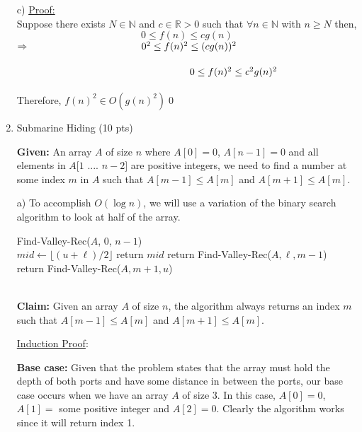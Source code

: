 \documentclass[11pt]{article}
\begin{document}
\begin{enumerate}
c) \underline{Proof:}\\
\-\hspace{1.5cm}Suppose there exists ${N \in \mathbb{N}}$ and ${c \in \mathbb{R} > 0}$ such that ${\forall n \in \mathbb{N}}$ with ${n \geq N}$ then, $$0 \leq f(n) \leq cg(n)$$ 
\-\hspace{1.5cm}${\Rightarrow \-\hspace{3.95cm} 0^2 \leq f(n)^2 \leq (cg(n))^2}$\\
\- \\
${\-\hspace{6.1cm} 0 \leq f(n)^2 \leq c^2g(n)^2}$\\
\- \\
\-\hspace{1.5cm} Therefore, ${f(n)^2 \in O(g(n)^2)}$\-\hspace{9cm}\qed

\item Submarine Hiding (10 pts)

{\bf Given:} An array $A$ of size $n$ where $A[0] = 0$, $A[n - 1] = 0$ and all elements in $A[1$ .... $n-2]$ are positive integers, we need to find a number at some index $m$ in $A$ such that $A[m - 1] \leq A[m]$ and $A[m + 1] \leq A[m]$.

a) To accomplish $O(\log n)$, we will use a variation of the binary search algorithm to look at half of the array. 
\- \\

\begin{algorithmic}[1]
	\State Find-Valley-Rec($A$, 0, $n-1$)
\EndFunction
\\
 \State ${mid \gets \lfloor (u + \ell)/2  \rfloor}$
	\State return $mid$
	\State return Find-Valley-Rec($A, \ell, m - 1$)
\Else 
	\State return Find-Valley-Rec($A, m + 1, u$)
\EndIf 
\EndFunction
\end{algorithmic}

\- \\
{\bf Claim:} Given an array $A$ of size $n$, the algorithm always returns an index $m$ such that $A[m - 1] \leq A[m]$ and $A[m + 1] \leq A[m]$.

\underline{Induction Proof}:

{\bf Base case:} Given that the problem states that the array must hold the depth of both ports and have some distance in between the ports, our base case occurs when we have an array $A$ of size 3. In this case, $A[0] = 0$, $A[1] =$ some positive integer and $A[2] = 0$. Clearly the algorithm works since it will return index 1.


\end{enumerate}
\end{document}
